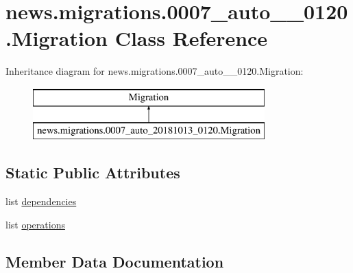 \hypertarget{classnews_1_1migrations_1_10007__auto__20181013__0120_1_1_migration}{}\section{news.\+migrations.0007\+\_\+auto\+\_\+\_\+0120.Migration Class Reference}
\label{classnews_1_1migrations_1_10007__auto__20181013__0120_1_1_migration}
Inheritance diagram for news.\+migrations.0007\+\_\+auto\+\_\+\_\+0120.Migration\+:\begin{figure}[H]
\begin{center}
\leavevmode
\includegraphics[height=2.000000cm]{classnews_1_1migrations_1_10007__auto__20181013__0120_1_1_migration}
\end{center}
\end{figure}
\subsection*{Static Public Attributes}
\begin{DoxyCompactItemize}
\item 
list \mbox{\hyperlink{classnews_1_1migrations_1_10007__auto__20181013__0120_1_1_migration_a1b2591a8eeaf626e4725684d54a1fdcb}{dependencies}}
\item 
list \mbox{\hyperlink{classnews_1_1migrations_1_10007__auto__20181013__0120_1_1_migration_af1237b52d8a38918f6d7d1ad584aca31}{operations}}
\end{DoxyCompactItemize}


\subsection{Member Data Documentation}
\mbox{\label{classnews_1_1migrations_1_10007__auto__20181013__0120_1_1_migration_a1b2591a8eeaf626e4725684d54a1fdcb}} 
